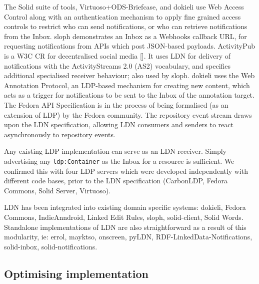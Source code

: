 \documentclass[a4paper]{llncs}
\begin{document}
                                    
\par The Solid suite of tools, Virtuoso+ODS-Briefcase, and dokieli use \empty Web Access Control along with an authentication mechanism to apply fine grained access controls to restrict who can send notifications, or who can retrieve notifications from the Inbox. sloph demonstrates an Inbox as a \empty Webhooks callback URL, for requesting notifications from APIs which post JSON-based payloads. \empty ActivityPub is a W3C CR for decentralised social media []. It uses LDN for delivery of notifications with the \empty ActivityStreams 2.0 (AS2) vocabulary, and specifies additional specialised receiver behaviour; also used by sloph. dokieli uses the \empty Web Annotation Protocol, an LDP-based mechanism for creating new content, which acts as a trigger for notifications to be sent to the Inbox of the annotation target. The \empty Fedora API Specification is in the process of being formalised (as an extension of LDP) by the Fedora community. The repository event stream draws upon the LDN specification, allowing LDN consumers and senders to react asynchronously to repository events.

                                    
\par Any existing LDP implementation can serve as an LDN receiver. Simply advertising any {\tt ldp:Container} as the Inbox for a resource is sufficient. We confirmed this with four LDP servers which were developed independently with different code bases, prior to the LDN specification (CarbonLDP, Fedora Commons, Solid Server, Virtuoso).

                                    
\par LDN has been integrated into existing domain specific systems: dokieli, Fedora Commons, IndieAnndroid, Linked Edit Rules, sloph, solid-client, Solid Words. Standalone implementations of LDN are also straightforward as a result of this modularity, ie: errol, mayktso, onscreen, pyLDN, RDF-LinkedData-Notifications, solid-inbox, solid-notifications.
                                
                            

                            
                                \subsection{Optimising implementation}
  \label{optimising-implementation}

                                
                                    
\end{document}
